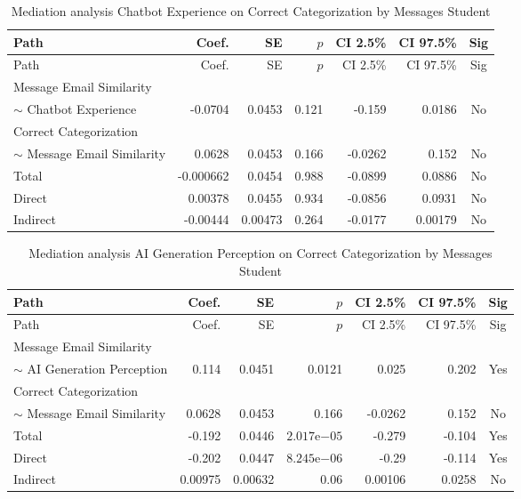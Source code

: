 \begin{longtable}{lrrrrrc}
            \caption{Mediation analysis Chatbot Experience on Correct Categorization by  Messages Student}\label{tab:mediation Chatbot Experience on Correct Categorization by  Messages Student}\\
            \toprule
            Path & Coef. & SE & $p$ & CI 2.5\% & CI 97.5\% & Sig \\
            \midrule
            \endfirsthead
            \toprule
            Path & Coef. & SE & $p$ & CI 2.5\% & CI 97.5\% & Sig \\
            \midrule
            \endhead
            \bottomrule
            \endfoot
            Message Email Similarity\\ $\sim$ Chatbot Experience & -0.0704 & 0.0453 & 0.121 & -0.159 & 0.0186 & No \\
Correct Categorization\\ $\sim$ Message Email Similarity & 0.0628 & 0.0453 & 0.166 & -0.0262 & 0.152 & No \\
Total & -0.000662 & 0.0454 & 0.988 & -0.0899 & 0.0886 & No \\
Direct & 0.00378 & 0.0455 & 0.934 & -0.0856 & 0.0931 & No \\
Indirect & -0.00444 & 0.00473 & 0.264 & -0.0177 & 0.00179 & No \\
\end{longtable}

\begin{longtable}{lrrrrrc}
            \caption{Mediation analysis AI Generation Perception on Correct Categorization by  Messages Student}\label{tab:mediation AI Generation Perception on Correct Categorization by  Messages Student}\\
            \toprule
            Path & Coef. & SE & $p$ & CI 2.5\% & CI 97.5\% & Sig \\
            \midrule
            \endfirsthead
            \toprule
            Path & Coef. & SE & $p$ & CI 2.5\% & CI 97.5\% & Sig \\
            \midrule
            \endhead
            \bottomrule
            \endfoot
            Message Email Similarity\\ $\sim$ AI Generation Perception & 0.114 & 0.0451 & 0.0121 & 0.025 & 0.202 & Yes \\
Correct Categorization\\ $\sim$ Message Email Similarity & 0.0628 & 0.0453 & 0.166 & -0.0262 & 0.152 & No \\
Total & -0.192 & 0.0446 & $2.017\mathrm{e}{-05}$ & -0.279 & -0.104 & Yes \\
Direct & -0.202 & 0.0447 & $8.245\mathrm{e}{-06}$ & -0.29 & -0.114 & Yes \\
Indirect & 0.00975 & 0.00632 & 0.06 & 0.00106 & 0.0258 & No \\
\end{longtable}

